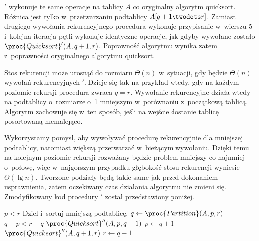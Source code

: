 
\subproblem %
$'$ wykonuje te same operacje na tablicy $A$ co oryginalny algorytm quicksort.
Różnica jest tylko w~przetwarzaniu podtablicy $A[q+1\twodots r]$.
Zamiast drugiego wywołania rekurencyjnego procedura wykonuje przypisanie w~wierszu 5 i~kolejna iteracja pętli  wykonuje identyczne operacje, jak gdyby wywołane zostało $\proc{Quicksort}'(A,q+1,r)$.
Poprawność algorytmu wynika zatem z~poprawności oryginalnego algorytmu quicksort.

\subproblem %
Stos rekurencji może urosnąć do rozmiaru $\Theta(n)$ w~sytuacji, gdy będzie $\Theta(n)$ wywołań rekurencyjnych $'$.
Dzieje się tak na przykład wtedy, gdy na każdym poziomie rekursji procedura  zwraca $q=r$.
Wywołanie rekurencyjne działa wtedy na podtablicy o~rozmiarze o~1 mniejszym w~porównaniu z~początkową tablicą.
Algorytm zachowuje się w~ten sposób, jeśli na wejście dostanie tablicę posortowaną niemalejąco.

\subproblem %
Wykorzystamy pomysł, aby wywoływać procedurę rekurencyjnie dla mniejszej podtablicy, natomiast większą przetwarzać w~bieżącym wywołaniu.
Dzięki temu na kolejnym poziomie rekursji rozważany będzie problem mniejszy co najmniej o~połowę, więc w~najgorszym przypadku głębokość stosu rekurencji wyniesie $\Theta(\lg n)$.
Tworzone podziały będą takie same jak przed dokonaniem usprawnienia, zatem oczekiwany czas działania algorytmu nie zmieni się.
Zmodyfikowany kod procedury $'$ został przedstawiony poniżej.
\begin{codebox}
\li	\While $p<r$
\li		\Do \Comment Dziel i~sortuj mniejszą podtablicę.
\li			$q\gets\proc{Partition}(A,p,r)$
\li			\If $q-p<r-q$
\li				\Then $\proc{Quicksort}''(A,p,q-1)$
\li					$p\gets q+1$
\li				\Else $\proc{Quicksort}''(A,q+1,r)$
\li					$r\gets q-1$
				\End
		\End
\end{codebox}
